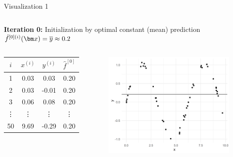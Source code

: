 \begin{vbframe}{Visualization 1}
\begin{footnotesize}
\begin{columns}
\end{columns}
\end{footnotesize}
\framebreak

\begin{footnotesize}
\textbf{Iteration 0:} Initialization by optimal constant (mean) prediction $\hat f^{[0](i)}(\xv) = \overline{y} \approx 0.2$

\vspace*{0.2cm}

\begin{columns}

\column{5cm}
\begin{center}
\begin{tabular}{c|c|c|c}
$i$ & $x^{(i)}$ & $y^{(i)}$ & $\hat{f}^{[0]}$ \\ \hline
1 & 0.03 &  0.03 & 0.20 \\
2 & 0.03 & -0.01 & 0.20 \\
3 & 0.06 &  0.08 & 0.20 \\
\vdots & \vdots & \vdots & \vdots \\
50 & 9.69 & -0.29 & 0.20\\
\end{tabular}
\end{center}

\column{5cm}
\begin{figure}
  \includegraphics[width=\textwidth]{figure_man/gbm_anim_init.png}
\end{figure}

\end{columns}


\end{footnotesize}
\end{vbframe}

